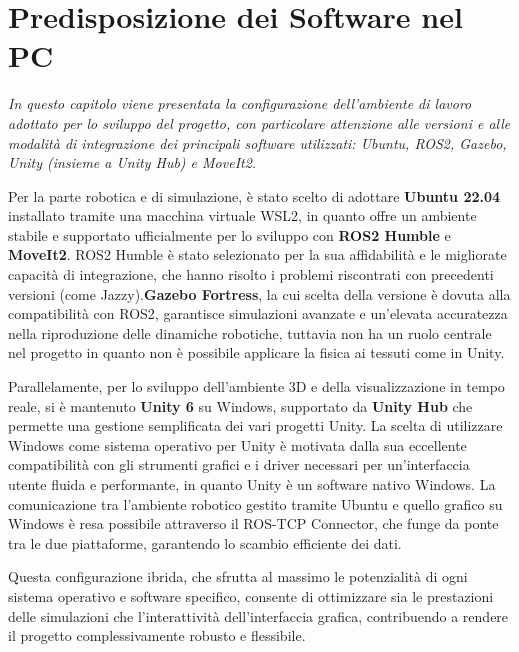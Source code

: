 \documentclass[11pt]{report}
\begin{document}

\section{Predisposizione dei Software nel PC}
\textit{In questo capitolo viene presentata la configurazione dell'ambiente di lavoro adottato per lo sviluppo del progetto, con particolare attenzione alle versioni e alle modalità di integrazione dei principali software utilizzati: Ubuntu, ROS2, Gazebo, Unity (insieme a Unity Hub) e MoveIt2.}

Per la parte robotica e di simulazione, è stato scelto di adottare \textbf{Ubuntu 22.04} installato tramite una macchina virtuale WSL2, in quanto offre un ambiente stabile e supportato ufficialmente per lo sviluppo con \textbf{ROS2 Humble} e \textbf{MoveIt2}. ROS2 Humble è stato selezionato per la sua affidabilità e le migliorate capacità di integrazione, che hanno risolto i problemi riscontrati con precedenti versioni (come Jazzy).\textbf{Gazebo Fortress}, la cui scelta della versione è dovuta alla compatibilità con ROS2\cite{Gazebo-ROS2}, garantisce simulazioni avanzate e un'elevata accuratezza nella riproduzione delle dinamiche robotiche, tuttavia non ha un ruolo centrale nel progetto in quanto non è possibile applicare la fisica ai tessuti come in Unity.

Parallelamente, per lo sviluppo dell'ambiente 3D e della visualizzazione in tempo reale, si è mantenuto \textbf{Unity 6} su Windows, supportato da \textbf{Unity Hub} che permette una gestione semplificata dei vari progetti Unity. La scelta di utilizzare Windows come sistema operativo per Unity è motivata dalla sua eccellente compatibilità con gli strumenti grafici e i driver necessari per un'interfaccia utente fluida e performante, in quanto Unity è un software nativo Windows. La comunicazione tra l'ambiente robotico gestito tramite Ubuntu e quello grafico su Windows è resa possibile attraverso il ROS-TCP Connector, che funge da ponte tra le due piattaforme, garantendo lo scambio efficiente dei dati.

Questa configurazione ibrida, che sfrutta al massimo le potenzialità di ogni sistema operativo e software specifico, consente di ottimizzare sia le prestazioni delle simulazioni che l'interattività dell'interfaccia grafica, contribuendo a rendere il progetto complessivamente robusto e flessibile.
\end{document}
